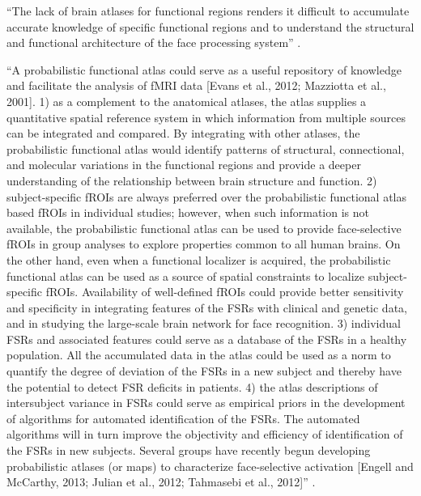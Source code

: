 ``The lack of brain atlases for functional regions renders it difficult to
accumulate accurate knowledge of specific functional regions and to understand
the structural and functional architecture of the face processing system''
\citep{zhen2015quantifying}.

``A probabilistic functional atlas could serve as a useful repository of
knowledge and facilitate the analysis of fMRI data [Evans et al., 2012;
Mazziotta et al., 2001].
%
1) as a complement to the anatomical atlases, the atlas supplies a quantitative
spatial reference system in which information from multiple sources can be
integrated and compared.
%
By integrating with other atlases, the probabilistic functional atlas would
identify patterns of structural, connectional, and molecular variations in the
functional regions and provide a deeper understanding of the relationship
between brain structure and function.
%
2) subject-specific fROIs are always preferred over the probabilistic functional
atlas based fROIs in individual studies;
%
however, when such information is not available, the probabilistic functional
atlas can be used to provide face-selective fROIs in group analyses to explore
properties common to all human brains.
%
On the other hand, even when a functional localizer is acquired, the
probabilistic functional atlas can be used as a source of spatial constraints to
localize subject-specific fROIs.
%
Availability of well-defined fROIs could provide better sensitivity and
specificity in integrating features of the FSRs with clinical and genetic data,
and in studying the large-scale brain network for face recognition.
%
3) individual FSRs and associated features could serve as a
database of the FSRs in a healthy population.
%
All the accumulated data in the atlas could be used as a norm to quantify the
degree of deviation of the FSRs in a new subject and thereby have the potential
to detect FSR deficits in patients.
%
4) the atlas descriptions of intersubject variance in FSRs could serve as
empirical priors in the development of algorithms for automated identification
of the FSRs.
%
The automated algorithms will in turn improve the objectivity and efficiency of
identification of the FSRs in new subjects.
%
Several groups have recently begun developing probabilistic atlases (or maps) to
characterize face-selective activation [Engell and McCarthy, 2013; Julian et
al., 2012; Tahmasebi et al., 2012]'' \citep{zhen2015quantifying}.

